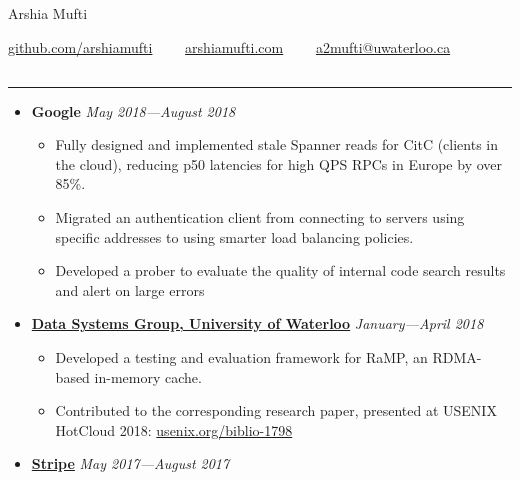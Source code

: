 \documentclass[5pt,letterpaper]{article}
\begin{document}
\begin{center}
  {\huge Arshia Mufti}


  \href{https://github.com/arshiamufti/}{github.com/arshiamufti}\ \ \textbullet
  \ \ \href{http://arshiamufti.com}{arshiamufti.com}\ \ \textbullet
  \ \ \href{mailto:a2mufti@uwaterloo.ca}{a2mufti@uwaterloo.ca}

\end{center}
\vspace{-2.0em}
\subsection*{}
\hrule
\vspace{1.0em}
\begin{itemize}[leftmargin=1em, noitemsep]
     \item[]
    {\textbf{Google} \hfill
    \emph{May 2018---August 2018}}
    \begin{itemize}[label=\textbullet, noitemsep, nosep]
      \item Fully designed and implemented stale Spanner reads for CitC (clients in the cloud), reducing p50 latencies for high QPS RPCs in Europe by over 85\%.
      \item Migrated an authentication client from connecting to servers using specific addresses to using smarter load balancing policies.
      \item Developed a prober to evaluate the quality of internal code search results and alert on large errors
    \end{itemize}
    
  \item[]
    {\href{http://dsg.uwaterloo.ca}{\textbf{Data Systems Group, University of
      Waterloo}} \hfill
    \emph{January---April 2018}}
    \begin{itemize}[label=\textbullet, noitemsep, nosep]
      \item Developed a testing and evaluation framework for RaMP, an RDMA-based in-memory cache.
        \item Contributed to the corresponding research paper, presented at USENIX HotCloud 2018: {\href{https://www.usenix.org/biblio-1798}{usenix.org/biblio-1798}}
    \end{itemize}

  \item[]
    {\href{https://stripe.com}{\textbf{Stripe}} \hfill
    \emph{May 2017---August 2017}}


\end{itemize}
\end{document}
